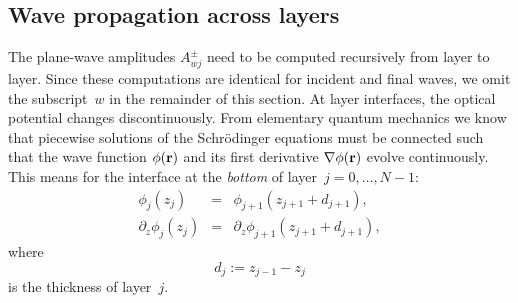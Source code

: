 \subsection{Wave propagation across layers}\label{Sacrolay}

%
%
%

The plane-wave amplitudes $A^\pm_{wj}$ need to be computed recursively
from layer to layer.
Since these computations are identical for incident and final waves,
we omit the subscript~$w$ in the remainder of this section.
At layer interfaces, the optical potential changes discontinuously.
From elementary quantum mechanics we know that
piecewise solutions of the Schrödinger equations must be connected
such that the wave function $\phi(\mathbf{r})$ and its first derivative
$\mathbf{\nabla}\phi(\mathbf{r})$ evolve continuously.
This means for the interface
at the \textit{bottom} of layer~$j=0,\ldots,N-1$:%
\begin{equation}\label{Econtcond}
  \begin{array}{lcl}
            \phi_j(z_j)&=&\phi_{j+1}(z_{j+1}+d_{j+1}),\\
            \partial_z\phi_j(z_j)&=&\partial_z\phi_{j+1}(z_{j+1}+d_{j+1}),
  \end{array}
\end{equation}
  where
\begin{equation}
  d_j:=z_{j-1}-z_{j}
\end{equation}
is the thickness of layer~$j$.

